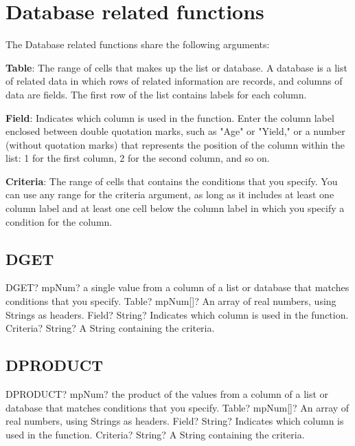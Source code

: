 \newpage
\section{Database related functions}
The Database related functions share the following arguments:

\vspace{0.3cm}
\textsf{\textbf{Table}}: The range of cells that makes up the list or database. A database is a list of related data in which rows of related information are records, and columns of data are fields. The first row of the list contains labels for each column.

\vspace{0.3cm}
\textsf{\textbf{Field}}: Indicates which column is used in the function. Enter the column label enclosed between double quotation marks, such as "Age" or "Yield," or a number (without quotation marks) that represents the position of the column within the list: 1 for the first column, 2 for the second column, and so on.

\vspace{0.3cm}
\textsf{\textbf{Criteria}}: The range of cells that contains the conditions that you specify. You can use any range for the criteria argument, as long as it includes at least one column label and at least one cell below the column label in which you specify a condition for the column.




\subsection{DGET}

\begin{mpFunctionsExtract}
	\mpWorksheetFunctionThreeNotImplemented
	{DGET? mpNum? a single value from a column of a list or database that matches conditions that you specify.}
	{Table? mpNum[]? An array of real numbers, using Strings as headers.}
	{Field? String? Indicates which column is used in the function.}
	{Criteria? String? A String containing the criteria.}
\end{mpFunctionsExtract}




\subsection{DPRODUCT}

\begin{mpFunctionsExtract}
	\mpWorksheetFunctionThreeNotImplemented
	{DPRODUCT? mpNum? the product of the values from a column of a list or database that matches conditions that you specify.}
	{Table? mpNum[]? An array of real numbers, using Strings as headers.}
	{Field? String? Indicates which column is used in the function.}
	{Criteria? String? A String containing the criteria.}
\end{mpFunctionsExtract}




